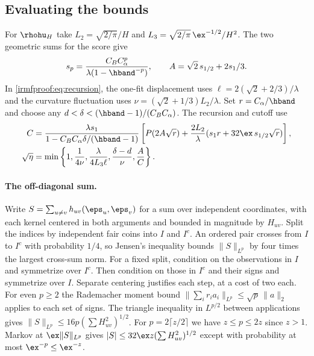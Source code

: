 \subsection{Evaluating the bounds}\label{irmfproof:app:constants}

For \(\rhohu_H\) take \(L_2=\sqrt{2/\pi}/H\) and
\(L_3=\sqrt{2/\pi}\,\ex^{-1/2}/H^2\). The two geometric sums for the score give
\[
 s_p=\frac{C_B C_\alpha^p}{\lambda(1-\hband^{-p})},\qquad
 A=\sqrt2\,s_{1/2}+2s_1/3 .
\]
In \eqref{irmfproof:eq:recursion}, the one-fit displacement uses
\(\ell=2(\sqrt2+2/3)/\lambda\) and the curvature fluctuation uses
\(\nu=(\sqrt2+1/3)L_2/\lambda\).
Set \(r=C_\alpha/\hband\) and choose any
\(d<\delta<(\hband-1)/(C_B C_\alpha)\). The recursion and cutoff use
\begin{equation}\label{irmfproof:eq:cutoff}
 \begin{aligned}
 C&=\frac{\lambda s_1}{1-C_B C_\alpha\delta/(\hband-1)}
    \left[P(2A\sqrt r)+\frac{2L_2}{\lambda}
       (s_1 r+32\ex\,s_{1/2}\sqrt r)\right],\\
 \sqrt\eta&=\min\left\{1,\frac{1}{4\nu},\frac{\lambda}{4L_3\ell},
                \frac{\delta-d}{\nu},\frac{A}{C}\right\}.
 \end{aligned}
\end{equation}

\paragraph{The off-diagonal sum.}
Write \(S=\sum_{u\ne v}h_{uv}(\eps_u,\eps_v)\) for a sum over independent
coordinates, with each kernel centered in both arguments and bounded in magnitude by \(H_{uv}\).
Split the indices by independent fair coins into \(I\) and
\(I^c\). An ordered pair crosses from \(I\) to \(I^c\) with probability
\(1/4\), so Jensen's inequality bounds \(\|S\|_{L^p}\) by four times the
largest cross-sum norm. For a fixed split, condition on the observations
in \(I\) and symmetrize over \(I^c\). Then condition on those in \(I^c\)
and their signs and symmetrize over \(I\). Separate centering justifies
each step, at a cost of two each. For even \(p\ge2\) the Rademacher moment
bound \(\|\sum_i r_i a_i\|_{L^p}\le\sqrt p\,\|a\|_2\) applies to each
set of signs. The triangle inequality in \(L^{p/2}\) between applications
gives \(\|S\|_{L^p}\le16p(\sum H_{uv}^2)^{1/2}\).
For \(p=2\lceil z/2\rceil\) we have \(z\le p\le2z\) since \(z>1\).
Markov at \(\ex\|S\|_{L^p}\) gives
\(|S|\le32\ex z(\sum H_{uv}^2)^{1/2}\) except with probability
at most \(\ex^{-p}\le\ex^{-z}\).
